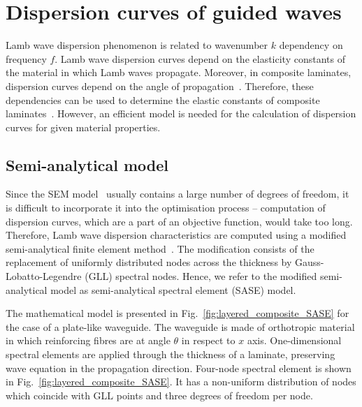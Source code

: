 \documentclass[preprint,12pt]{elsarticle}
\begin{document}
\section{Dispersion curves of guided waves \label{sec:dispersion_curves}}
Lamb wave dispersion phenomenon is related to wavenumber $k$ dependency on frequency $f$. 
Lamb wave dispersion curves depend on the elasticity constants of the material in which Lamb waves propagate. 
Moreover, in composite laminates, dispersion curves depend on the angle of propagation~\cite{Rose1999}. 
Therefore, these dependencies can be used to determine the elastic constants of composite laminates~\cite{Kudela2020}.
However, an efficient model is needed for the calculation of dispersion curves for given material properties.

\subsection{Semi-analytical model}
Since the SEM model~\cite{Kudela2020a} usually contains a large number of degrees of freedom, it is difficult to incorporate it into the optimisation process – computation of dispersion curves, which are a part of an objective function, would take too long. 
Therefore, Lamb wave dispersion characteristics are computed using a modified semi-analytical finite element method~\cite{Bartoli2006,Marzani2008}. 
The modification consists of the replacement of uniformly distributed nodes across the thickness by Gauss-Lobatto-Legendre (GLL) spectral nodes. 
Hence, we refer to the modified semi-analytical model as semi-analytical spectral element (SASE) model.
	
The mathematical model is presented in Fig.~\ref{fig:layered_composite_SASE} for the case of a plate-like waveguide.  
The waveguide is made of orthotropic material in which reinforcing fibres are at angle $\theta$ in respect to $x$ axis.
One-dimensional spectral elements are applied through the thickness of a laminate, preserving wave equation in the propagation direction.  
Four-node spectral element is shown in Fig.~\ref{fig:layered_composite_SASE}. 
It has a non-uniform distribution of nodes which coincide with GLL points and three degrees of freedom per node.
	
\end{document}
